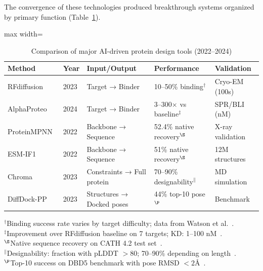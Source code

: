 The convergence of these technologies produced breakthrough systems organized by primary function (Table~\ref{tab:design_tools}).

\begin{table}[h]
\centering
\caption{Comparison of major AI-driven protein design tools (2022--2024)}
\label{tab:design_tools}
\small
\begin{adjustbox}{max width=\textwidth}
\begin{tabular}{@{}lllll@{}}
\toprule
\textbf{Method} & \textbf{Year} & \textbf{Input/Output} & \textbf{Performance} & \textbf{Validation} \\
\midrule
RFdiffusion~\cite{watson2023rfdiffusion} & 2023 & Target → Binder & 10--50\% binding$^\dagger$ & Cryo-EM (100s) \\
AlphaProteo~\cite{zambaldi2024alphaproteo} & 2024 & Target → Binder & 3--300$\times$ vs baseline$^\ddagger$ & SPR/BLI (nM) \\
ProteinMPNN~\cite{dauparas2022proteinmpnn} & 2022 & Backbone → Sequence & 52.4\% native recovery$^\S$ & X-ray validation \\
ESM-IF1~\cite{hsu2022esmif1} & 2022 & Backbone → Sequence & 51\% native recovery$^\S$ & 12M structures \\
Chroma~\cite{ingraham2023chroma} & 2023 & Constraints → Full protein & 70--90\% designability$^\|$ & MD simulation \\
DiffDock-PP~\cite{ketata2023diffdockpp} & 2023 & Structures → Docked poses & 44\% top-10 pose$^\P$ & Benchmark \\
\bottomrule
\end{tabular}
\end{adjustbox}
\begin{flushleft}
\footnotesize{$^\dagger$Binding success rate varies by target difficulty; data from Watson et al.~\cite{watson2023rfdiffusion}.}\\
\footnotesize{$^\ddagger$Improvement over RFdiffusion baseline on 7 targets; KD: 1--100 nM~\cite{zambaldi2024alphaproteo}.}\\
\footnotesize{$^\S$Native sequence recovery on CATH 4.2 test set~\cite{dauparas2022proteinmpnn,hsu2022esmif1}.}\\
\footnotesize{$^\|$Designability: fraction with pLDDT $> 80$; 70--90\% depending on length~\cite{ingraham2023chroma}.}\\
\footnotesize{$^\P$Top-10 success on DBD5 benchmark with pose RMSD $< 2$\AA~\cite{ketata2023diffdockpp}.}
\end{flushleft}
\end{table}

